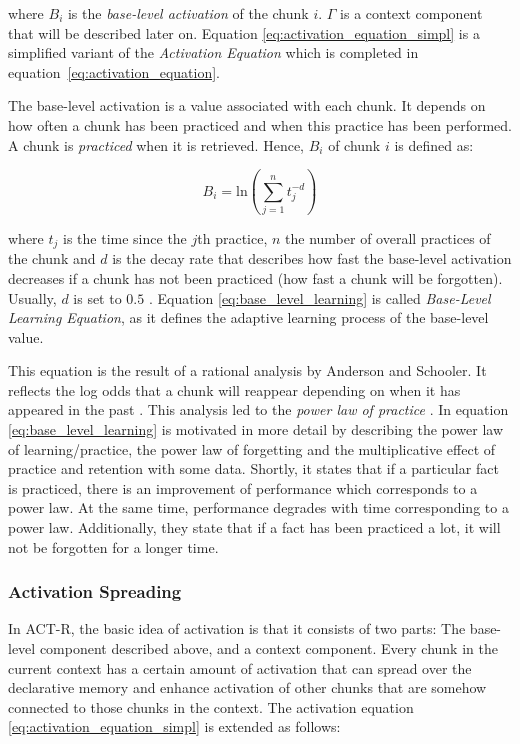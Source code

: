 where $B_i$ is the \emph{base-level activation} of the chunk $i$. $\Gamma$ is a context component that will be described later on. Equation \eqref{eq:activation_equation_simpl} is a simplified variant of the \emph{Activation Equation} which is completed in equation~\eqref{eq:activation_equation}.

The base-level activation is a value associated with each chunk. It depends on how often a chunk has been practiced and when this practice has been performed. A chunk is \emph{practiced} when it is retrieved. Hence, $B_i$ of chunk $i$ is defined as:

\begin{equation}
\label{eq:base_level_learning}
B_i = \mathrm{ln}\left(\sum_{j=1}^n{t_j^{-d}}\right)
\end{equation}

where $t_j$ is the time since the $j$th practice, $n$ the number of overall practices of the chunk and $d$ is the decay rate that describes how fast the base-level activation decreases if a chunk has not been practiced (how fast a chunk will be forgotten). Usually, $d$ is set to $0.5$ \cite[p. 1042]{anderson_integrated_2004}. Equation \eqref{eq:base_level_learning} is called \emph{Base-Level Learning Equation}, as it defines the adaptive learning process of the base-level value.

This equation is the result of a rational analysis by Anderson and Schooler. It reflects the log odds that a chunk will reappear depending on when it has appeared in the past \cite[33]{taatgen_modeling_2006}. This analysis led to the \emph{power law of practice} \cite[1042]{anderson_integrated_2004}. In \cite[8--11]{anderson_implications_2000} equation \eqref{eq:base_level_learning} is motivated in more detail by describing the power law of learning/practice, the power law of forgetting and the multiplicative effect of practice and retention with some data. Shortly, it states that if a particular fact is practiced, there is an improvement of performance which corresponds to a power law. At the same time, performance degrades with time corresponding to a power law. Additionally, they state that if a fact has been practiced a lot, it will not be forgotten for a longer time.

\subsubsection{Activation Spreading}

In ACT-R, the basic idea of activation is that it consists of two parts: The base-level component described above, and a context component. Every chunk in the current context has a certain amount of activation that can spread over the declarative memory and enhance activation of other chunks that are somehow connected to those chunks in the context. The activation equation \eqref{eq:activation_equation_simpl} is extended as follows:

